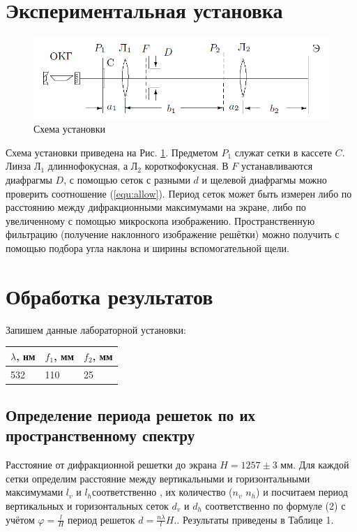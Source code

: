 \documentclass[a4paper,12pt]{article}
\begin{document}
\section{Экспериментальная установка}
\begin{figure}[h!]
	\centering
	\includegraphics[scale=0.8]{4.png}
	\caption{Схема установки}
	\label{fig:stand}
\end{figure}
Схема установки приведена на Рис. \ref{fig:stand}. Предметом $P_1$ служат сетки в кассете $C$. Линза $\text{Л}_1$ длиннофокусная, а $\text{Л}_2$ короткофокусная. В $F$ устанавливаются диафрагмы $D$, с помощью сеток с разными $d$ и щелевой диафрагмы можно проверить соотношение (\ref{equ:allow}). Период сеток может быть измерен либо по расстоянию между дифракционными максимумами на экране, либо по увеличенному с помощью микроскопа изображению. Пространственную фильтрацию (получение наклонного изображение решётки) можно получить с помощью подбора угла наклона и ширины вспомогательной щели.

\section{Обработка результатов}

Запишем данные лабораторной установки:
\begin{table}[h!]
		\centering
		\begin{tabular}{|l|l|l|}
			\hline
			$\lambda$, нм & $f_1$, мм & $f_2$, мм \\ \hline
			532           & 110       & 25        \\ \hline
		\end{tabular}
	\end{table}
\subsection{Определение периода решеток по их пространственному спектру}

 Расстояние от дифракционной решетки до экрана $H = 1257 \pm 3$ мм. Для каждой сетки определим расстояние между вертикальными и горизонтальными максимумами $l_{v}$ и $l_{h}$соответственно , их количество ($n_{v}$  $n_{h}$) и посчитаем период вертикальных и горизонтальных сеток  $d_{v}$ и $d_{h}$ соответственно по формуле (2) с учётом $\varphi = \frac{l}{H}$ период решеток $d = \frac{n \lambda}{l}H$.. Результаты приведены в Таблице 1.
	
\end{document}
